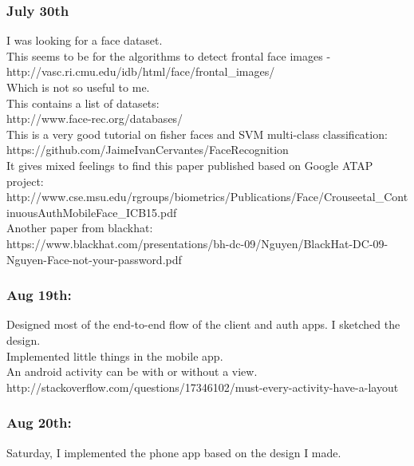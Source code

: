 \documentclass[11pt]{article}
\begin{document}
\subsubsection*{July 30th}
I was looking for a face dataset.\\
This seems to be for the algorithms to detect frontal face images - http://vasc.ri.cmu.edu/idb/html/face/frontal\_images/ \\
Which is not so useful to me.\\

This contains a list of datasets:\\
http://www.face-rec.org/databases/\\

This is a very good tutorial on fisher faces and SVM multi-class classification:\\
https://github.com/JaimeIvanCervantes/FaceRecognition\\

It gives mixed feelings to find this paper published based on Google ATAP project:\\
http://www.cse.msu.edu/rgroups/biometrics/Publications/Face/Crouseetal\_ContinuousAuthMobileFace\_ICB15.pdf\\

Another paper from blackhat:\\
https://www.blackhat.com/presentations/bh-dc-09/Nguyen/BlackHat-DC-09-Nguyen-Face-not-your-password.pdf\\

\subsubsection*{Aug 19th:}
Designed most of the end-to-end flow of the client and auth apps.
I sketched the design.\\
Implemented little things in the mobile app.\\
An android activity can be with or without a view. http://stackoverflow.com/questions/17346102/must-every-activity-have-a-layout\\

\subsubsection*{Aug 20th:}
Saturday, I implemented the phone app based on the design I made.
\end{document}
